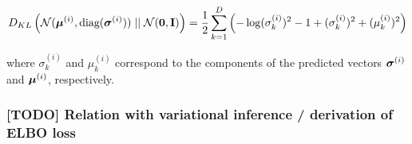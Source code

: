 \begin{equation}	
	\kl{\normal}{\standardnormal} = \latentspaceconstraintclosedform
\end{equation}

where $\sigma_k^{(i)}$ and $\mu_k^{(i)}$ correspond to the components of the predicted vectors $\sigmai$ and $\mui$, respectively.



\subsubsection{[TODO] Relation with variational inference / derivation of ELBO loss}

%
%
%
%
%
%
%
%
%

